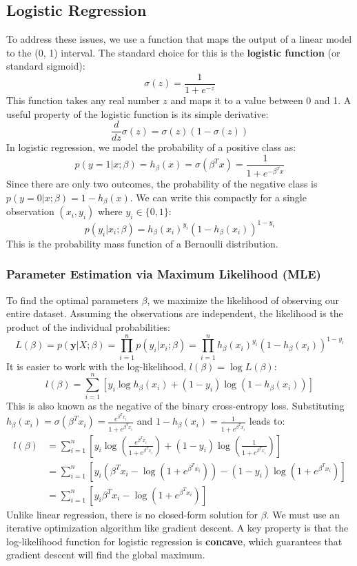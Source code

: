 \documentclass{article}
\begin{document}
\begin{multicols}{2}
	\subsection{Logistic Regression}
	To address these issues, we use a function that maps the output of a linear model to the (0, 1) interval. The standard choice for this is the \textbf{logistic function} (or standard sigmoid):
	$$ \sigma(z) = \frac{1}{1 + e^{-z}} $$
	This function takes any real number $z$ and maps it to a value between 0 and 1. A useful property of the logistic function is its simple derivative:
	$$ \frac{d}{dz}\sigma(z) = \sigma(z)(1 - \sigma(z)) $$
	In logistic regression, we model the probability of a positive class as:
	$$ p(y=1|x; \beta) = h_\beta(x) = \sigma(\beta^T x) = \frac{1}{1 + e^{-\beta^T x}} $$
	Since there are only two outcomes, the probability of the negative class is $p(y=0|x; \beta) = 1 - h_\beta(x)$. We can write this compactly for a single observation $(x_i, y_i)$ where $y_i \in \{0, 1\}$:
	$$ p(y_i|x_i; \beta) = h_\beta(x_i)^{y_i} (1 - h_\beta(x_i))^{1-y_i} $$
	This is the probability mass function of a Bernoulli distribution.

	\subsubsection{Parameter Estimation via Maximum Likelihood (MLE)}
	To find the optimal parameters $\beta$, we maximize the likelihood of observing our entire dataset. Assuming the observations are independent, the likelihood is the product of the individual probabilities:
	$$ L(\beta) = p(\mathbf{y}|X; \beta) = \prod_{i=1}^{n} p(y_i|x_i; \beta) = \prod_{i=1}^{n} h_\beta(x_i)^{y_i} (1 - h_\beta(x_i))^{1-y_i} $$
	It is easier to work with the log-likelihood, $l(\beta) = \log L(\beta)$:
	$$ l(\beta) = \sum_{i=1}^{n} \left[ y_i \log h_\beta(x_i) + (1-y_i) \log(1 - h_\beta(x_i)) \right] $$
	This is also known as the negative of the binary cross-entropy loss. Substituting $h_\beta(x_i) = \sigma(\beta^T x_i) = \frac{e^{\beta^T x_i}}{1 + e^{\beta^T x_i}}$ and $1-h_\beta(x_i) = \frac{1}{1 + e^{\beta^T x_i}}$ leads to:
	\begin{align*}
		l(\beta) & = \sum_{i=1}^{n} \left[ y_i \log\left(\frac{e^{\beta^T x_i}}{1 + e^{\beta^T x_i}}\right) + (1-y_i) \log\left(\frac{1}{1 + e^{\beta^T x_i}}\right) \right] \\
		         & = \sum_{i=1}^{n} \left[ y_i (\beta^T x_i - \log(1 + e^{\beta^T x_i})) - (1-y_i)\log(1 + e^{\beta^T x_i}) \right]                                          \\
		         & = \sum_{i=1}^{n} \left[ y_i \beta^T x_i - \log(1 + e^{\beta^T x_i}) \right]
	\end{align*}
	Unlike linear regression, there is no closed-form solution for $\beta$. We must use an iterative optimization algorithm like gradient descent. A key property is that the log-likelihood function for logistic regression is \textbf{concave}, which guarantees that gradient descent will find the global maximum.


\end{multicols}
\end{document}

